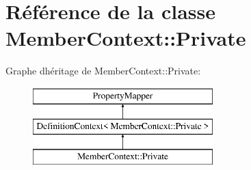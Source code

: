 \hypertarget{class_member_context_1_1_private}{}\section{Référence de la classe Member\+Context\+:\+:Private}
\label{class_member_context_1_1_private}
Graphe d\textquotesingle{}héritage de Member\+Context\+:\+:Private\+:\begin{figure}[H]
\begin{center}
\leavevmode
\includegraphics[height=3.000000cm]{class_member_context_1_1_private}
\end{center}
\end{figure}
